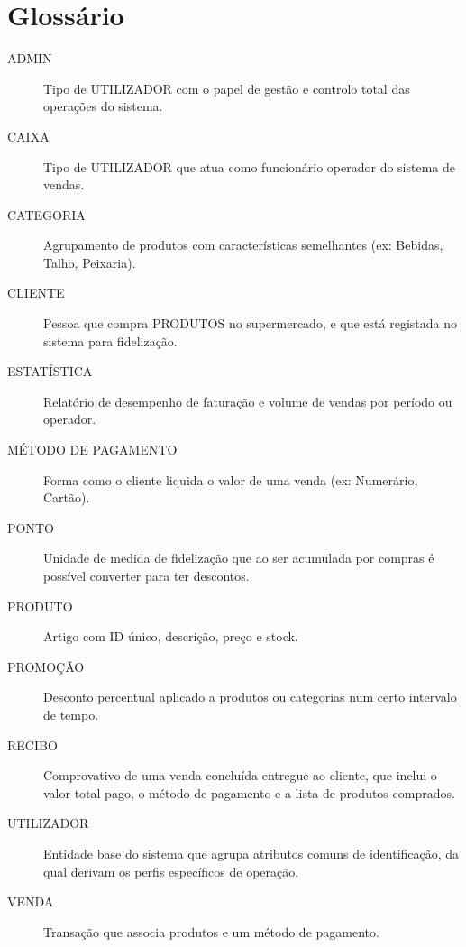 \documentclass[a4paper]{llncs}
\begin{document}
\section{Glossário}
\begin{description}
    \item[ADMIN] Tipo de UTILIZADOR com o papel de gestão e controlo total das operações do sistema.
    \item[CAIXA] Tipo de UTILIZADOR que atua como funcionário operador do sistema de vendas.
    \item[CATEGORIA] Agrupamento de produtos com características semelhantes (ex: Bebidas, Talho, Peixaria).
    \item[CLIENTE] Pessoa que compra PRODUTOS no supermercado, e que está registada no sistema para fidelização.
    \item[ESTATÍSTICA] Relatório de desempenho de faturação e volume de vendas por período ou operador.
    \item[MÉTODO DE PAGAMENTO] Forma como o cliente liquida o valor de uma venda (ex: Numerário, Cartão).
    \item[PONTO] Unidade de medida de fidelização que ao ser acumulada por compras é possível converter para ter descontos.
    \item[PRODUTO] Artigo com ID único, descrição, preço e stock.
    \item[PROMOÇÃO] Desconto percentual aplicado a produtos ou categorias num certo intervalo de tempo.
    \item[RECIBO] Comprovativo de uma venda concluída entregue ao cliente, que inclui o valor total pago, o método de pagamento e a lista de produtos comprados.
    \item[UTILIZADOR] Entidade base do sistema que agrupa atributos comuns de identificação, da qual derivam os perfis específicos de operação.
    \item[VENDA] Transação que associa produtos e um método de pagamento.
\end{description}
\end{document}
